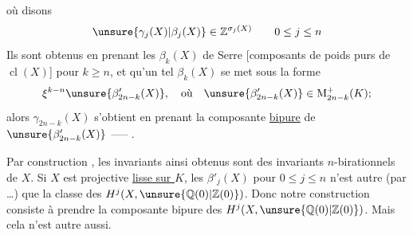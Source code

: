 où disons
\[
\unsure{\gamma_j(X)|\beta_j(X)}\in\mathbb{Z}^{\sigma_j(X)}
\qquad 0\leq j\leq n
\]
Ils sont obtenus en prenant les
$\beta_k(X)$ de Serre [composants de poids purs
de $\operatorname{cl}(X)$] pour $k\geq n$, et 
qu'un tel $\beta_k(X)$ se met sous la forme
\[
\xi^{k-n}\unsure{\beta'_{2n-k}(X)},\quad\text{où}\quad
\unsure{\beta'_{2n-k}(X)}\in\mathrm{M}^{+}_{2n-k}(K);
\]
alors $\gamma_{2n-k}(X)$ s'obtient en prenant la composante
\uline{bipure} de $\unsure{\beta'_{2n-k}(X)}$ ----- .

Par construction , les invariants
ainsi obtenus sont des invariants
$n$-birationnels de $X$. Si $X$ est projective
\uline{lisse sur $K$}, les $\beta'_j(X)$ pour $0\leq j\leq n$
n'est autre (par \ldots) que
la classe des $H^j(X,\unsure{\mathbb{Q}(0)|\mathbb{Z}(0)})$. Donc notre construction
consiste à prendre la composante bipure des
$H^j(X,\unsure{\mathbb{Q}(0)|\mathbb{Z}(0)})$. Mais cela n'est autre aussi.
